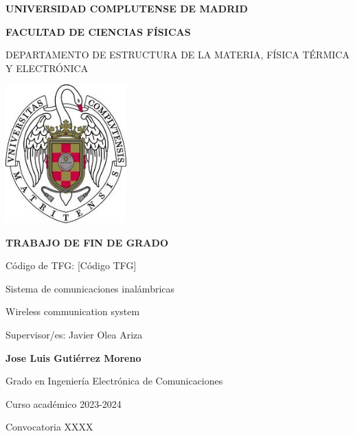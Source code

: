 \documentclass[11pt, a4paper]{article} %
\begin{document}
\begin{titlepage}
\centering
{ \bfseries \Large UNIVERSIDAD COMPLUTENSE DE MADRID}
\vspace{0.5cm}

{\bfseries  \Large FACULTAD DE CIENCIAS FÍSICAS} 
\vspace{1cm}

{\large DEPARTAMENTO DE ESTRUCTURA DE LA MATERIA, FÍSICA TÉRMICA Y ELECTRÓNICA}
\vspace{0.8cm}

{\includegraphics[width=0.35\textwidth]{logo_UCM}}

\vspace{0.8cm}


{\bfseries \Large TRABAJO DE FIN DE GRADO}
\vspace{2cm}

{\Large Código de TFG:  [C\'odigo TFG] } \vspace{5mm}

{\Large Sistema de comunicaciones inalámbricas}\vspace{5mm}

{\Large Wireless communication system}\vspace{5mm}

{\Large Supervisor/es: Javier Olea Ariza}\vspace{20mm} 

{\bfseries \LARGE Jose Luis Gutiérrez Moreno}\vspace{5mm} 

{\large Grado en Ingeniería Electrónica de Comunicaciones}\vspace{5mm} 

{\large Curso acad\'emico 2023-2024}\vspace{5mm} 

{\large Convocatoria XXXX}\vspace{5mm} 

\end{titlepage}
\end{document}
